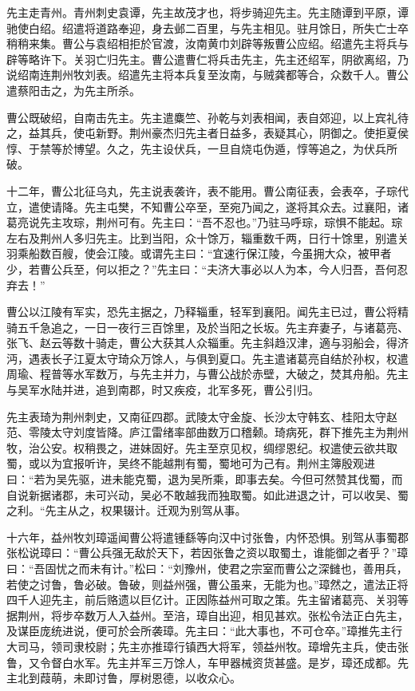 \documentclass[12pt,UTF8]{ctexbook}
\begin{document}
先主走青州。青州刺史袁谭，先主故茂才也，将步骑迎先主。先主随谭到平原，谭驰使白绍。绍遣将道路奉迎，身去邺二百里，与先主相见。驻月馀日，所失亡士卒稍稍来集。曹公与袁绍相拒於官渡，汝南黄巾刘辟等叛曹公应绍。绍遣先主将兵与辟等略许下。关羽亡归先主。曹公遣曹仁将兵击先主，先主还绍军，阴欲离绍，乃说绍南连荆州牧刘表。绍遣先主将本兵复至汝南，与贼龚都等合，众数千人。曹公遣蔡阳击之，为先主所杀。

曹公既破绍，自南击先主。先主遣麋竺、孙乾与刘表相闻，表自郊迎，以上宾礼待之，益其兵，使屯新野。荆州豪杰归先主者日益多，表疑其心，阴御之。使拒夏侯惇、于禁等於博望。久之，先主设伏兵，一旦自烧屯伪遁，惇等追之，为伏兵所破。

十二年，曹公北征乌丸，先主说表袭许，表不能用。曹公南征表，会表卒，子琮代立，遣使请降。先主屯樊，不知曹公卒至，至宛乃闻之，遂将其众去。过襄阳，诸葛亮说先主攻琮，荆州可有。先主曰：“吾不忍也。”乃驻马呼琮，琮惧不能起。琮左右及荆州人多归先主。比到当阳，众十馀万，辎重数千两，日行十馀里，别遣关羽乘船数百艘，使会江陵。或谓先主曰：“宜速行保江陵，今虽拥大众，被甲者少，若曹公兵至，何以拒之？”先主曰：“夫济大事必以人为本，今人归吾，吾何忍弃去！”

曹公以江陵有军实，恐先主据之，乃释辎重，轻军到襄阳。闻先主已过，曹公将精骑五千急追之，一日一夜行三百馀里，及於当阳之长坂。先主弃妻子，与诸葛亮、张飞、赵云等数十骑走，曹公大获其人众辎重。先主斜趋汉津，適与羽船会，得济沔，遇表长子江夏太守琦众万馀人，与俱到夏口。先主遣诸葛亮自结於孙权，权遣周瑜、程普等水军数万，与先主并力，与曹公战於赤壁，大破之，焚其舟船。先主与吴军水陆并进，追到南郡，时又疾疫，北军多死，曹公引归。

先主表琦为荆州刺史，又南征四郡。武陵太守金旋、长沙太守韩玄、桂阳太守赵范、零陵太守刘度皆降。庐江雷绪率部曲数万口稽颡。琦病死，群下推先主为荆州牧，治公安。权稍畏之，进妹固好。先主至京见权，绸缪恩纪。权遣使云欲共取蜀，或以为宜报听许，吴终不能越荆有蜀，蜀地可为己有。荆州主簿殷观进曰：“若为吴先驱，进未能克蜀，退为吴所乘，即事去矣。今但可然赞其伐蜀，而自说新据诸郡，未可兴动，吴必不敢越我而独取蜀。如此进退之计，可以收吴、蜀之利。“先主从之，权果辍计。迁观为别驾从事。

十六年，益州牧刘璋遥闻曹公将遣锺繇等向汉中讨张鲁，内怀恐惧。别驾从事蜀郡张松说璋曰：“曹公兵强无敌於天下，若因张鲁之资以取蜀土，谁能御之者乎？”璋曰：“吾固忧之而未有计。”松曰：“刘豫州，使君之宗室而曹公之深雠也，善用兵，若使之讨鲁，鲁必破。鲁破，则益州强，曹公虽来，无能为也。”璋然之，遣法正将四千人迎先主，前后赂遗以巨亿计。正因陈益州可取之策。先主留诸葛亮、关羽等据荆州，将步卒数万人入益州。至涪，璋自出迎，相见甚欢。张松令法正白先主，及谋臣庞统进说，便可於会所袭璋。先主曰：“此大事也，不可仓卒。”璋推先主行大司马，领司隶校尉；先主亦推璋行镇西大将军，领益州牧。璋增先主兵，使击张鲁，又令督白水军。先主并军三万馀人，车甲器械资货甚盛。是岁，璋还成都。先主北到葭萌，未即讨鲁，厚树恩德，以收众心。
\end{document}
